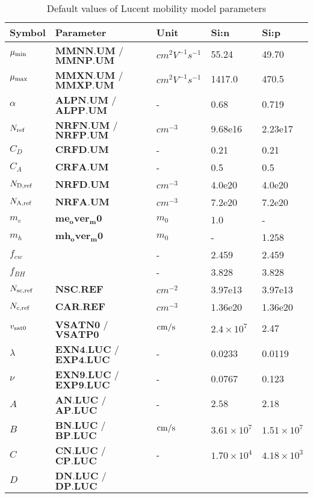 \documentclass[oneside,12pt]{cgd_book}
\begin{document}
\begin{longtable}{lllll}
\caption{\label{tab:Equation:Mobility:Lucent:Param}Default values of Lucent mobility model parameters} \\
\hline
 Symbol
& Parameter
& Unit
& Si:n
& Si:p\\
\hline
 $\mu_{\rm min}$
& $\mathbf{MMNN.UM}$ / $\mathbf{MMNP.UM}$
& $cm^2V^{-1}s^{-1}$
& 55.24
& 49.70
\\
 $\mu_{\rm max}$
& $\mathbf{MMXN.UM}$ / $\mathbf{MMXP.UM}$
& $cm^2V^{-1}s^{-1}$
& 1417.0
& 470.5
\\
 $\alpha$
& $\mathbf{ALPN.UM}$ / $\mathbf{ALPP.UM}$
& -
& 0.68
& 0.719
\\
 $N_{\rm ref}$
& $\mathbf{NRFN.UM}$ / $\mathbf{NRFP.UM}$
& $cm^{-3}$
& 9.68e16
& 2.23e17
\\
 $C_D$
& $\mathbf{CRFD.UM}$
& -
& 0.21
& 0.21
\\
 $C_A$
& $\mathbf{CRFA.UM}$
& -
& 0.5
& 0.5
\\
 $N_{\rm D,ref}$
& $\mathbf{NRFD.UM}$
& $cm^{-3}$
& 4.0e20
& 4.0e20
\\
 $N_{\rm A,ref}$
& $\mathbf{NRFA.UM}$
& $cm^{-3}$
& 7.2e20
& 7.2e20
\\
 $m_e$
& $\mathbf{me_over_m0}$
& $m_0$
& 1.0
& -
\\
 $m_h$
& $\mathbf{mh_over_m0}$
& $m_0$
& -
& 1.258
\\
 $f_{cw}$
&
& -
& 2.459
& 2.459
\\
 $f_{BH}$
&
& -
& 3.828
& 3.828
\\
 $N_{\rm sc, ref}$
& $\mathbf{NSC.REF}$
& $cm^{-2}$
& 3.97e13
& 3.97e13
\\
 $N_{\rm c,ref}$
& $\mathbf{CAR.REF}$
& $cm^{-3}$
& 1.36e20
& 1.36e20
\\
 $v_{\rm sat0}$
& $\mathbf{VSATN0}$ / $\mathbf{VSATP0}$
& $\text{cm}\text{/}\text{s}$
& $2.4\times10^7$
& 2.47
\\
 $\lambda$
& $\mathbf{EXN4.LUC}$ / $\mathbf{EXP4.LUC}$
& -
& 0.0233
& 0.0119
\\
 $\nu$
& $\mathbf{EXN9.LUC}$ / $\mathbf{EXP9.LUC}$
& -
& 0.0767
& 0.123
\\
 $A$
& $\mathbf{AN.LUC}$ / $\mathbf{AP.LUC}$
& -
& $2.58$
& $2.18$
\\
 $B$
& $\mathbf{BN.LUC}$ / $\mathbf{BP.LUC}$
& $\text{cm}\text{/}\text{s}$
& $3.61\times 10^{7}$
& $1.51\times 10^{7}$
\\
 $C$
& $\mathbf{CN.LUC}$ / $\mathbf{CP.LUC}$
& -
& $1.70\times 10^{4}$
& $4.18\times 10^{3}$
\\
 $D$
& $\mathbf{DN.LUC}$ / $\mathbf{DP.LUC}$

\end{longtable}
\end{document}
